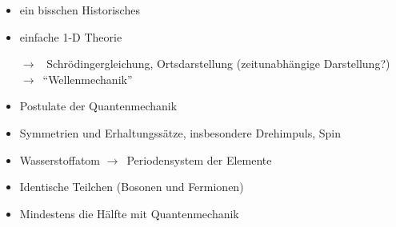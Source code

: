 \documentclass[oneside]{book}
\theoremstyle{definition}
\newcommand{\conseq}{$\rightarrow$~}
\newcommand{\QM}{Quantenmechanik}
\begin{document}
\begin{itemize}
	\item ein bisschen Historisches
	\item einfache 1-D Theorie
	\item[\conseq] Schrödingergleichung, Ortsdarstellung (zeitunabhängige Darstellung?) \conseq "`Wellenmechanik"'
	\item Postulate der \QM
	\item Symmetrien und Erhaltungssätze, insbesondere Drehimpuls, Spin
	\item Wasserstoffatom \conseq Periodensystem der Elemente
	\item Identische Teilchen (Bosonen und Fermionen)
	\item Mindestens die Hälfte mit Quantenmechanik
\end{itemize}


\appendix
\end{document}
